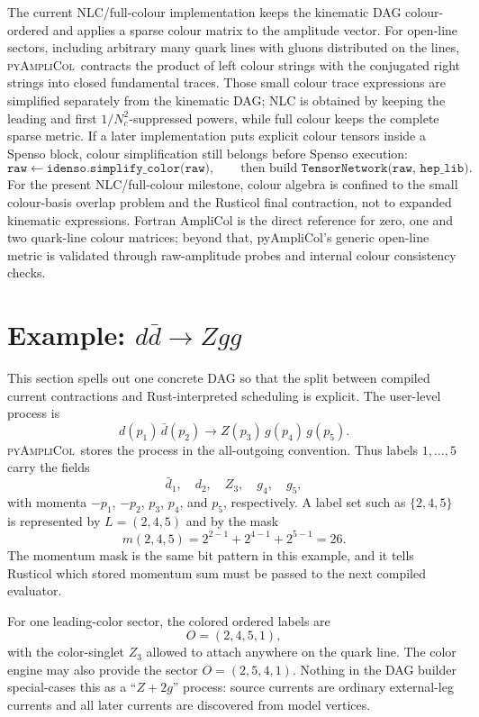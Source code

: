 \documentclass[10pt]{article}
\newcommand{\PAC}{\textsc{pyAmpliCol}}
\begin{document}
The current NLC/full-colour implementation keeps the kinematic DAG
colour-ordered and applies a sparse colour matrix to the amplitude vector.  For
open-line sectors, including arbitrary many quark lines with gluons distributed
on the lines, \PAC\ contracts the product of left colour strings with the
conjugated right strings into closed fundamental traces.  Those small colour
trace expressions are simplified separately from the kinematic DAG; NLC is
obtained by keeping the leading and first \(1/N_c^2\)-suppressed powers, while
full colour keeps the complete sparse metric.  If a later implementation puts
explicit colour tensors inside a Spenso block, colour simplification still
belongs before Spenso execution:
\[
  \texttt{raw} \leftarrow \texttt{idenso.simplify\_color(raw)} ,
  \qquad
  \text{then build } \texttt{TensorNetwork(raw, hep\_lib)}.
\]
For the present NLC/full-colour milestone, colour algebra is confined to the
small colour-basis overlap problem and the Rusticol final contraction, not to
expanded kinematic expressions.  Fortran AmpliCol is the direct reference for
zero, one and two quark-line colour matrices; beyond that, pyAmpliCol's generic
open-line metric is validated through raw-amplitude probes and internal colour
consistency checks.

\section{Example: \texorpdfstring{$d\bar d\to Zgg$}{d dbar -> Z g g}}

This section spells out one concrete DAG so that the split between compiled
current contractions and Rust-interpreted scheduling is explicit.  The
user-level process is
\[
  d(p_1)\,\bar d(p_2)\to Z(p_3)\,g(p_4)\,g(p_5).
\]
\PAC\ stores the process in the all-outgoing convention.  Thus labels
$1,\ldots,5$ carry the fields
\[
  \bar d_1,\quad d_2,\quad Z_3,\quad g_4,\quad g_5,
\]
with momenta $-p_1$, $-p_2$, $p_3$, $p_4$, and $p_5$, respectively.  A
label set such as $\{2,4,5\}$ is represented by
$L=(2,4,5)$ and by the mask
\[
  m(2,4,5)=2^{2-1}+2^{4-1}+2^{5-1}=26.
\]
The momentum mask is the same bit pattern in this example, and it tells
Rusticol which stored momentum sum must be passed to the next compiled
evaluator.

For one leading-color sector, the colored ordered labels are
\[
  O=(2,4,5,1),
\]
with the color-singlet $Z_3$ allowed to attach anywhere on the quark line.
The color engine may also provide the sector $O=(2,5,4,1)$.  Nothing in the
DAG builder special-cases this as a ``$Z+2g$'' process: source currents are
ordinary external-leg currents and all later currents are discovered from
model vertices.
\end{document}
